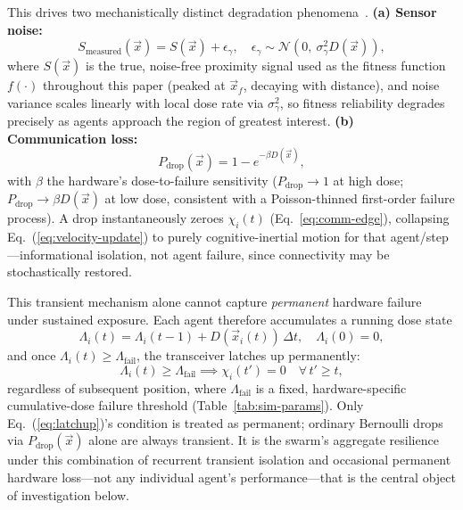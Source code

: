 \documentclass[conference]{IEEEtran}
\begin{document}
This drives two mechanistically distinct degradation phenomena~\cite{sensor_degradation}. \textbf{(a) Sensor noise:}
\begin{equation}
S_{\text{measured}}(\vec{x}) = S(\vec{x}) + \epsilon_\gamma, \quad \epsilon_\gamma \sim \mathcal{N}(0,\ \sigma_\gamma^2 D(\vec{x})),
\label{eq:sensor-noise}
\end{equation}
where $S(\vec{x})$ is the true, noise-free proximity signal used as the fitness function $f(\cdot)$ throughout this paper (peaked at $\vec{x}_f$, decaying with distance), and noise variance scales linearly with local dose rate via $\sigma_\gamma^2$, so fitness reliability degrades precisely as agents approach the region of greatest interest. \textbf{(b) Communication loss:}
\begin{equation}
P_{\text{drop}}(\vec{x}) = 1 - e^{-\beta D(\vec{x})},
\label{eq:pdrop}
\end{equation}
with $\beta$ the hardware's dose-to-failure sensitivity ($P_{\text{drop}}\to1$ at high dose; $P_{\text{drop}}\to\beta D(\vec{x})$ at low dose, consistent with a Poisson-thinned first-order failure process). A drop instantaneously zeroes $\chi_i(t)$ (Eq.~\ref{eq:comm-edge}), collapsing Eq.~(\ref{eq:velocity-update}) to purely cognitive-inertial motion for that agent/step---informational isolation, not agent failure, since connectivity may be stochastically restored.

This transient mechanism alone cannot capture \emph{permanent} hardware failure under sustained exposure. Each agent therefore accumulates a running dose state
\begin{equation}
\Lambda_i(t) = \Lambda_i(t-1) + D(\vec{x}_i(t))\,\Delta t, \quad \Lambda_i(0)=0,
\label{eq:cumdose}
\end{equation}
and once $\Lambda_i(t)\ge\Lambda_{\text{fail}}$, the transceiver latches up permanently:
\begin{equation}
\Lambda_i(t) \ge \Lambda_{\text{fail}} \implies \chi_i(t') = 0 \quad \forall\,t'\ge t,
\label{eq:latchup}
\end{equation}
regardless of subsequent position, where $\Lambda_{\text{fail}}$ is a fixed, hardware-specific cumulative-dose failure threshold (Table~\ref{tab:sim-params}). Only Eq.~(\ref{eq:latchup})'s condition is treated as permanent; ordinary Bernoulli drops via $P_{\text{drop}}(\vec{x})$ alone are always transient. It is the swarm's aggregate resilience under this combination of recurrent transient isolation and occasional permanent hardware loss---not any individual agent's performance---that is the central object of investigation below.
\end{document}
